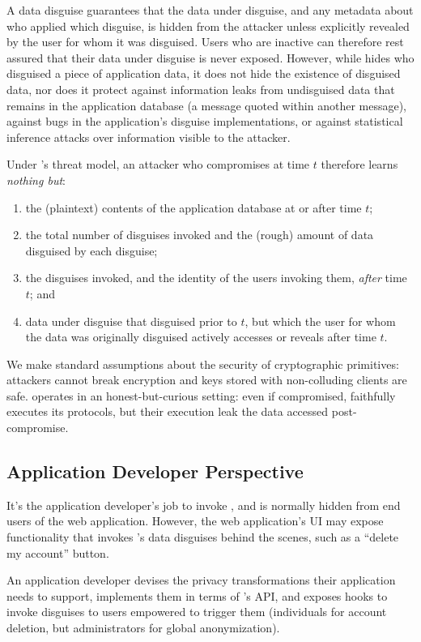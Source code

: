 %
A data disguise guarantees that the data under disguise, and any metadata about who
applied which disguise, is hidden from the attacker unless explicitly revealed by the
user for whom it was disguised.
%
Users who are inactive can therefore rest assured that their data under disguise
is never exposed.
%
However, while \sys hides who disguised a piece of application data, it does not hide
the existence of disguised data, nor does it protect against information leaks from
undisguised data that remains in the application database (\eg a message quoted
within another message), against bugs in the application's disguise
implementations, or against statistical inference attacks over information visible
to the attacker.
%

%
Under \sys's threat model, an attacker who compromises \sys at time $t$ therefore
learns \emph{nothing but}:
%
\begin{enumerate}[nosep]
  \item the (plaintext) contents of the application database at or after time $t$;
  \item the total number of disguises invoked and the (rough) amount of data
    disguised by each disguise;
  \item the disguises invoked, and the identity of the users invoking them,
    \emph{after} time $t$; and
  \item data under disguise that \sys disguised prior to $t$, but which
    the user for whom the data was originally disguised actively accesses or
    reveals after time $t$.
\end{enumerate}
%
We make standard assumptions about the security of cryptographic primitives: attackers
cannot break encryption and keys stored with non-colluding clients are safe.
%
\sys operates in an honest-but-curious setting: even if compromised, \sys faithfully
executes its protocols, but their execution leak the data accessed post-compromise.
%


\subsection{Application Developer Perspective}
%
It's the application developer's job to invoke \sys, and \sys is normally
hidden from end users of the web application.
%
However, the web application's UI may expose functionality that invokes \sys's
data disguises behind the scenes, such as a ``delete my account'' button.
%

%
An application developer devises the privacy transformations their application needs to
support, implements them in terms of \sys's API, and exposes hooks to invoke disguises to
users empowered to trigger them (\eg individuals for account deletion, but
administrators for global anonymization).
%

